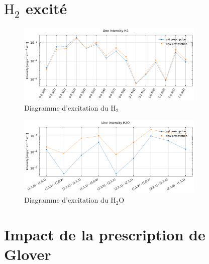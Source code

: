 \begin{appendices}
\section{$\mathrm{H}_2$ excité}
\label{appendix:type46}
\begin{figure}[!h]
    \centering \includegraphics[trim = {0 0 0 1cm},clip,width=0.8\textwidth]{figure/type46/I_comp_H2.pdf}
    \caption{Diagramme d'excitation du $\mathrm{H}_2$}
    \begin{minipage}{\textwidth}
    
    \end{minipage}
    \label{fig:type46:H2}
\end{figure}

\begin{figure}[!h]
    \centering \includegraphics[trim = {0 0 0 1cm},clip,width=0.8\textwidth]{figure/type46/I_comp_H2O.pdf}
    \caption{Diagramme d'excitation du $\mathrm{H}_2\mathrm{O}$}
    \begin{minipage}{\textwidth}
  
    \end{minipage}
    \label{fig:type46:H2O}
\end{figure}


\clearpage
\section{Impact de la prescription de Glover}




\end{appendices}
